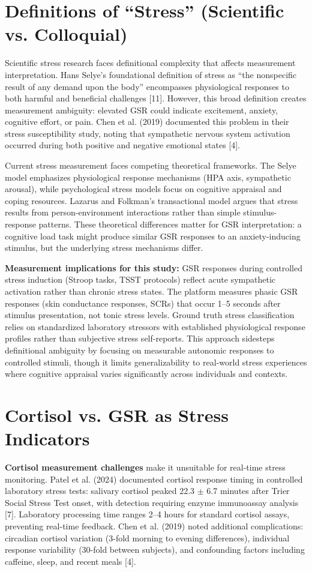 \section{Definitions of ``Stress'' (Scientific vs. Colloquial)}
Scientific stress research faces definitional complexity that affects measurement interpretation. Hans Selye's foundational definition of stress as ``the nonspecific result of any demand upon the body'' encompasses physiological responses to both harmful and beneficial challenges [11]. However, this broad definition creates measurement ambiguity: elevated GSR could indicate excitement, anxiety, cognitive effort, or pain. Chen et al. (2019) documented this problem in their stress susceptibility study, noting that sympathetic nervous system activation occurred during both positive and negative emotional states [4].

Current stress measurement faces competing theoretical frameworks. The Selye model emphasizes physiological response mechanisms (HPA axis, sympathetic arousal), while psychological stress models focus on cognitive appraisal and coping resources. Lazarus and Folkman's transactional model argues that stress results from person-environment interactions rather than simple stimulus-response patterns. These theoretical differences matter for GSR interpretation: a cognitive load task might produce similar GSR responses to an anxiety-inducing stimulus, but the underlying stress mechanisms differ.

\textbf{Measurement implications for this study:} GSR responses during controlled stress induction (Stroop tasks, TSST protocols) reflect acute sympathetic activation rather than chronic stress states. The platform measures phasic GSR responses (skin conductance responses, SCRs) that occur 1--5 seconds after stimulus presentation, not tonic stress levels. Ground truth stress classification relies on standardized laboratory stressors with established physiological response profiles rather than subjective stress self-reports. This approach sidesteps definitional ambiguity by focusing on measurable autonomic responses to controlled stimuli, though it limits generalizability to real-world stress experiences where cognitive appraisal varies significantly across individuals and contexts.

\section{Cortisol vs. GSR as Stress Indicators}
\textbf{Cortisol measurement challenges} make it unsuitable for real-time stress monitoring. Patel et al. (2024) documented cortisol response timing in controlled laboratory stress tests: salivary cortisol peaked 22.3 $\pm$ 6.7 minutes after Trier Social Stress Test onset, with detection requiring enzyme immunoassay analysis [7]. Laboratory processing time ranges 2--4 hours for standard cortisol assays, preventing real-time feedback. Chen et al. (2019) noted additional complications: circadian cortisol variation (3-fold morning to evening differences), individual response variability (30-fold between subjects), and confounding factors including caffeine, sleep, and recent meals [4].

